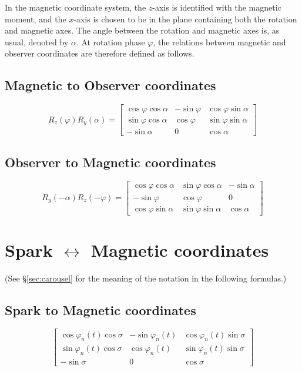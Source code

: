 \documentclass{book}
\newcommand{\phase}{\varphi}
\begin{document}
In the magnetic coordinate system, the $z$-axis is identified with the magnetic moment, and the $x$-axis is chosen to be in the plane containing both the rotation and magnetic axes.
The angle between the rotation and magnetic axes is, as usual, denoted by $\alpha$.
At rotation phase $\phase$, the relations between magnetic and observer coordinates are therefore defined as follows.

\subsection{Magnetic to Observer coordinates}
\begin{equation}
    R_z(\phase) R_y(\alpha) =
    \begin{bmatrix}
        \cos\phase\cos\alpha & -\sin\phase & \cos\phase\sin\alpha \\
        \sin\phase\cos\alpha &  \cos\phase & \sin\phase\sin\alpha \\
        -\sin\alpha          & 0           & \cos\alpha
    \end{bmatrix}
\end{equation}

\subsection{Observer to Magnetic coordinates}
\begin{equation}
    R_y(-\alpha) R_z(-\phase) =
    \begin{bmatrix}
        \cos\phase\cos\alpha & \sin\phase\cos\alpha & -\sin\alpha \\
        -\sin\phase          & \cos\phase           & 0           \\
        \cos\phase\sin\alpha & \sin\phase\sin\alpha &  \cos\alpha
    \end{bmatrix}
\end{equation}

\section{Spark $\leftrightarrow$ Magnetic coordinates}

(See \S\ref{sec:carousel} for the meaning of the notation in the following formulas.)

\subsection{Spark to Magnetic coordinates}
\begin{equation}
    \begin{bmatrix}
        \cos\phase_n(t)\cos\sigma & -\sin\phase_n(t) & \cos\phase_n(t)\sin\sigma \\
        \sin\phase_n(t)\cos\sigma &  \cos\phase_n(t) & \sin\phase_n(t)\sin\sigma \\
        -\sin\sigma          & 0           & \cos\sigma
    \end{bmatrix}
\end{equation}
\end{document}
